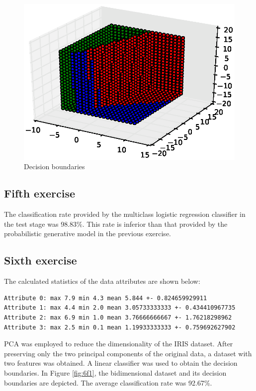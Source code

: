 \documentclass[a4paper,10pt]{article}
\begin{document}
\begin{figure}[htb]
 \centering
 \includegraphics[scale=0.7]{./figures/4f5.eps}
 \caption{Decision boundaries}
 \label{fig:4f5}
\end{figure}

\cleardoublepage
\subsection*{Fifth exercise}
The classification rate provided by the multiclass logistic regression classifier in the test stage was 98.83\%. This rate is inferior than that provided by the probabilistic generative model in the previous exercise.

\cleardoublepage
\subsection*{Sixth exercise}
The calculated statistics of the data attributes are shown below:
\begin{verbatim}
Attribute 0: max 7.9 min 4.3 mean 5.844 +- 0.824659929911
Attribute 1: max 4.4 min 2.0 mean 3.05733333333 +- 0.434410967735
Attribute 2: max 6.9 min 1.0 mean 3.76666666667 +- 1.76218298962
Attribute 3: max 2.5 min 0.1 mean 1.19933333333 +- 0.759692627902
\end{verbatim}
PCA was employed to reduce the dimensionality of the IRIS dataset. After preserving only the two principal components of the original data, a dataset with two features was obtained. A linear classifier was used to obtain the decision boundaries. In Figure \ref{fig:6f1}, the bidimensional dataset and its decision boundaries are depicted. The average classification rate was 92.67\%.
\end{document}
